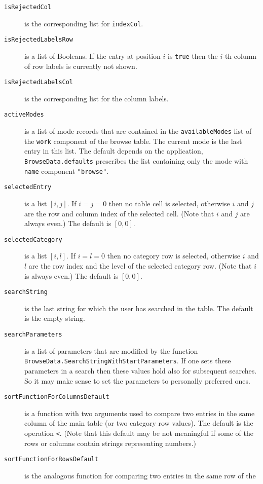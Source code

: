 \documentclass[a4paper,11pt]{report}
\begin{document}
{{{\begin{description}
\item[{\texttt{isRejectedCol}}]  is the corresponding list for \texttt{indexCol}. 
\item[{\texttt{isRejectedLabelsRow}}]  is a list of Booleans. If the entry at position $i$ is \texttt{true} then the $i$-th column of row labels is currently not shown. 
\item[{\texttt{isRejectedLabelsCol}}]  is the corresponding list for the column labels. 
\item[{\texttt{activeModes}}]  is a list of mode records that are contained in the \texttt{availableModes} list of the \texttt{work} component of the browse table. The current mode is the last entry in this
list. The default depends on the application, \texttt{BrowseData.defaults} prescribes the list containing only the mode with \texttt{name} component \texttt{"browse"}. 
\item[{\texttt{selectedEntry}}]  is a list $[ i, j ]$. If $i = j = 0$ then no table cell is selected, otherwise $i$ and $j$ are the row and column index of the selected cell. (Note that $i$ and $j$ are always even.) The default is $[ 0, 0 ]$. 
\item[{\texttt{selectedCategory}}]  is a list $[ i, l ]$. If $i = l = 0$ then no category row is selected, otherwise $i$ and $l$ are the row index and the level of the selected category row. (Note that $i$ is always even.) The default is $[ 0, 0 ]$. 
\item[{\texttt{searchString}}]  is the last string for which the user has searched in the table. The default
is the empty string. 
\item[{\texttt{searchParameters}}]  is a list of parameters that are modified by the function \texttt{BrowseData.SearchStringWithStartParameters}.  If one sets these parameters in a search then these values hold also for
subsequent searches. So it may make sense to set the parameters to personally
preferred ones. 
\item[{\texttt{sortFunctionForColumnsDefault}}]  is a function with two arguments used to compare two entries in the same
column of the main table (or two category row values). The default is the
operation \texttt{\texttt{}{\textless}}. (Note that this default may be not meaningful if some of the rows or columns
contain strings representing numbers.) 
\item[{\texttt{sortFunctionForRowsDefault}}]  is the analogous function for comparing two entries in the same row of the

\end{description}}}}
\end{document}
